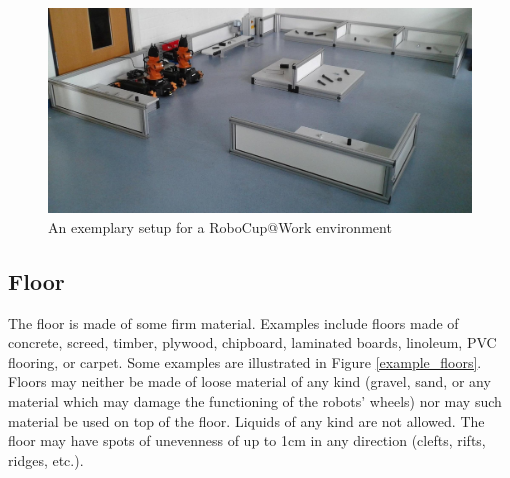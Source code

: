 \begin{figure}
\includegraphics[width= \textwidth ]{../images/example_arena.jpg}
\caption{An exemplary setup for a RoboCup@Work environment}
\end{figure}

\subsection{Floor}
The floor is made of some firm material. Examples include floors made of concrete, screed, timber, plywood, chipboard, laminated boards, linoleum, PVC flooring, or carpet. Some examples are illustrated in Figure \ref{example_floors}. Floors may neither be made of loose material of any kind (gravel, sand, or any material which may damage the functioning of the robots’ wheels) nor may such material be used on top of the floor. Liquids of any kind are not allowed. The floor may have spots of unevenness of up to 1cm in any direction (clefts, rifts, ridges, etc.).

